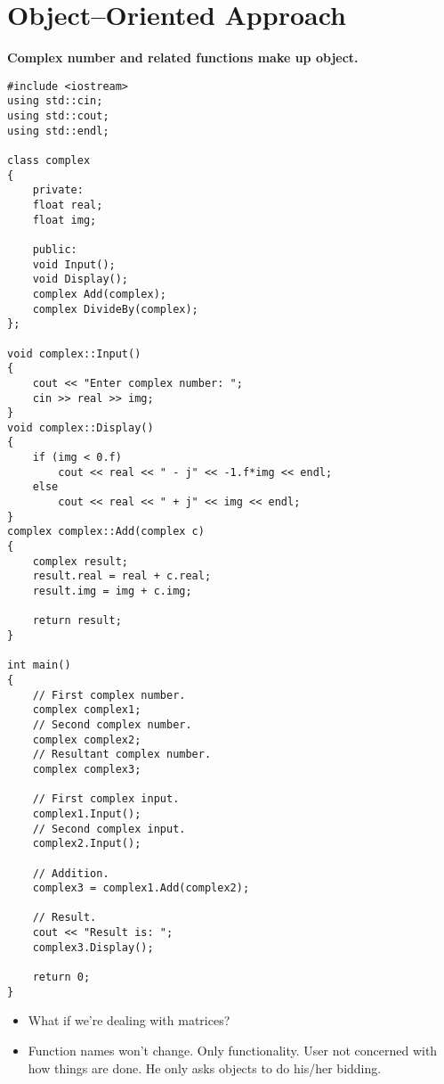 \documentclass[12pt,a4paper]{article}
\begin{document}
\section{Object--Oriented Approach}
\textbf{Complex number and related functions make up object.}
\begin{lstlisting}[caption={Object--oriented approach to add complex numbers}]
#include <iostream>
using std::cin;
using std::cout;
using std::endl;

class complex
{
	private:
	float real;
	float img;
	
	public:
	void Input();
	void Display();
	complex Add(complex);
	complex DivideBy(complex);
};

void complex::Input()
{
	cout << "Enter complex number: ";
	cin >> real >> img;
}
void complex::Display()
{
	if (img < 0.f)
		cout << real << " - j" << -1.f*img << endl;
	else
		cout << real << " + j" << img << endl;
}
complex complex::Add(complex c)
{
	complex result;
	result.real = real + c.real;
	result.img = img + c.img;
	
	return result;
}

int main()
{
	// First complex number.
	complex complex1;
	// Second complex number.
	complex complex2;
	// Resultant complex number.
	complex complex3;
	
	// First complex input.
	complex1.Input();
	// Second complex input.
	complex2.Input();
	
	// Addition.
	complex3 = complex1.Add(complex2);
	
	// Result.
	cout << "Result is: ";
	complex3.Display();
	
	return 0;
}
\end{lstlisting}
\begin{itemize}
\item What if we're dealing with matrices?
\item Function names won't change. Only functionality. User not concerned with how things are done. He only asks objects to do his/her bidding.
\end{itemize}
\nocite{*}


\end{document}
